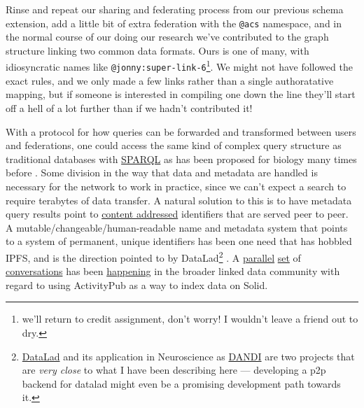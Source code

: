 \documentclass[10pt]{article}
\begin{document}
\begin{multicols}{2}
Rinse and repeat our sharing and federating process from our previous
schema extension, add a little bit of extra federation with the
\texttt{@acs} namespace, and in the normal course of our doing our
research we've contributed to the graph structure linking two common
data formats. Ours is one of many, with idiosyncratic names like
\texttt{@jonny:super-link-6}\footnote{we'll return to credit assignment,
  don't worry! I wouldn't leave a friend out to dry.}. We might not have
followed the exact rules, and we only made a few links rather than a
single authoratative mapping, but if someone is interested in compiling
one down the line they'll start off a hell of a lot further than if we
hadn't contributed it!

With a protocol for how queries can be forwarded and transformed between
users and federations, one could access the same kind of complex query
structure as traditional databases with
\href{https://www.w3.org/TR/sparql11-federated-query/}{SPARQL} \cite{SPARQLFederatedQuery2013}  as has been proposed for biology many
times before \cite{simaEnablingSemanticQueries2019, djokic-petrovicPIBASFedSPARQLWebbased2017, hasnainBioFedFederatedQuery2017} . Some division in the way that data
and metadata are handled is necessary for the network to work in
practice, since we can't expect a search to require terabytes of data
transfer. A natural solution to this is to have metadata query results
point to
\href{https://en.wikipedia.org/wiki/Content-addressable_storage}{content
addressed} identifiers that are served peer to peer. A
mutable/changeable/human-readable name and metadata system that points
to a system of permanent, unique identifiers has been one need that has
hobbled IPFS, and is the direction pointed to by DataLad\footnote{\href{https://www.datalad.org/}{DataLad}
  \cite{halchenkoDataLadDistributedSystem2021, hankeDefenseDecentralizedResearch2021}  and its application in
  Neuroscience as \href{https://dandiarchive.org}{DANDI} are two
  projects that are \emph{very close} to what I have been describing
  here --- developing a p2p backend for datalad might even be a
  promising development path towards it.} \cite{hankeDefenseDecentralizedResearch2021} . A
\href{https://mastodon.social/@humanetech/107155144840782386}{parallel}
\href{https://web.archive.org/web/20211024082055/https://socialhub.activitypub.rocks/t/which-links-between-activitypub-and-solid-project/529}{set}
of
\href{https://web.archive.org/web/20211024080845/https://socialhub.activitypub.rocks/t/how-solid-and-activitypub-complement-each-other-best/727}{conversations}
has been
\href{https://web.archive.org/web/20211024081238/https://forum.solidproject.org/t/discussion-solid-vs-activitypub/2685}{happening}
in the broader linked data community with regard to using ActivityPub as
a way to index data on Solid.


\end{multicols}
\end{document}
